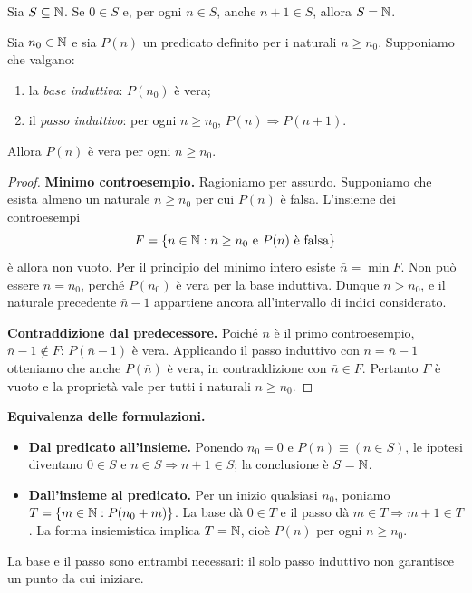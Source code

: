 \begin{proposizione}
Sia $S\subseteq\mathbb{N}$. Se $0\in S$ e, per ogni $n\in S$, anche $n+1\in S$, allora $S=\mathbb{N}$.
\end{proposizione}

\begin{proposizione}
Sia $n_0\in\mathbb{N}$ e sia $P(n)$ un predicato definito per i naturali $n\ge n_0$. Supponiamo che valgano:
\begin{enumerate}
  \item la \emph{base induttiva}: $P(n_0)$ è vera;
  \item il \emph{passo induttivo}: per ogni $n\ge n_0$, $P(n)\Rightarrow P(n+1)$.
\end{enumerate}
Allora $P(n)$ è vera per ogni $n\ge n_0$.
\end{proposizione}

\begin{proof}
\textbf{Minimo controesempio.} Ragioniamo per assurdo. Supponiamo che esista almeno un naturale $n\ge n_0$ per cui $P(n)$ è falsa. L'insieme dei controesempi
\[
  F=\{n\in\mathbb{N}:n\ge n_0\text{ e }P(n)\text{ è falsa}\}
\]
è allora non vuoto. Per il principio del minimo intero esiste $\bar n=\min F$. Non può essere $\bar n=n_0$, perché $P(n_0)$ è vera per la base induttiva. Dunque $\bar n>n_0$, e il naturale precedente $\bar n-1$ appartiene ancora all'intervallo di indici considerato.

\textbf{Contraddizione dal predecessore.} Poiché $\bar n$ è il primo controesempio, $\bar n-1\notin F$: $P(\bar n-1)$ è vera. Applicando il passo induttivo con $n=\bar n-1$ otteniamo che anche $P(\bar n)$ è vera, in contraddizione con $\bar n\in F$. Pertanto $F$ è vuoto e la proprietà vale per tutti i naturali $n\ge n_0$.
\end{proof}

\textbf{Equivalenza delle formulazioni.}
\begin{itemize}
  \item \textbf{Dal predicato all'insieme.} Ponendo $n_0=0$ e $P(n)\equiv(n\in S)$, le ipotesi diventano $0\in S$ e $n\in S\Rightarrow n+1\in S$; la conclusione è $S=\mathbb{N}$.
  \item \textbf{Dall'insieme al predicato.} Per un inizio qualsiasi $n_0$, poniamo $T=\{m\in\mathbb{N}:P(n_0+m)\}$. La base dà $0\in T$ e il passo dà $m\in T\Rightarrow m+1\in T$. La forma insiemistica implica $T=\mathbb{N}$, cioè $P(n)$ per ogni $n\ge n_0$.
\end{itemize}
La base e il passo sono entrambi necessari: il solo passo induttivo non garantisce un punto da cui iniziare.

